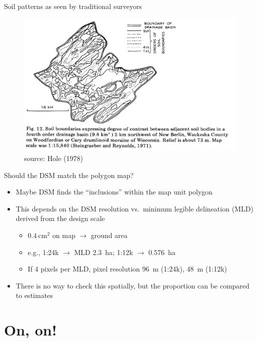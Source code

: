 \documentclass[aspectratio=169]{beamer}
\begin{document}
\begin{frame}{Soil patterns as seen by traditional surveyors}
    \begin{figure}
        \centering
        \includegraphics[height=0.75\textheight]{graphics_david/10.1016.0016-7061(78)90002-2_Fig12.png}
\\source: Hole (1978)
    \end{figure}
\end{frame}

\begin{frame}{Should the DSM match the polygon map?}
    \begin{itemize}
        \item Maybe DSM finds the ``inclusions'' within the map unit polygon
        \item This depends on the DSM resolution vs.\ minimum legible delineation (MLD) derived from the design scale
        \begin{itemize}
            \item $0.4~\mathrm{cm}^2$ on map $\to$ ground area
            \item e.g., 1:24k $\to$ MLD 2.3~ha; 1:12k $\to$ 0.576~ha
            \item If 4 pixels per MLD, pixel resolution 96~m (1:24k), 48~m (1:12k)
        \end{itemize}
        \item There is no way to check this spatially, but the proportion can be compared to estimates
    \end{itemize}
\end{frame}
\section{On, on!}
\end{document}
